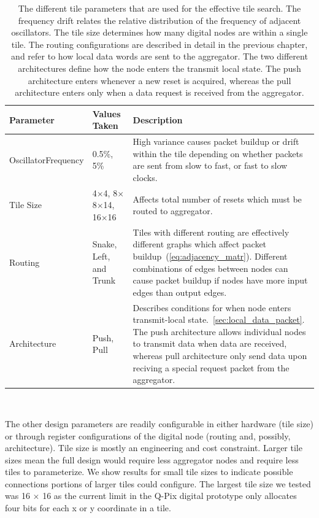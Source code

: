 \begin{table}
\begin{center}
\begin{tabular}{|| p{30mm} | p{30mm} | p{90mm} ||}
 \hline
 Parameter & Values Taken & Description \\ [0.5ex]
 \hline\hline
  Oscillator\newline Frequency & 0.5\%, 5\% & High variance causes packet buildup or drift within the tile depending on whether packets are sent from slow to fast, or fast to slow clocks. \\
 \hline
  Tile Size & 4$\times$4, 8$\times$8\newline 10$\times$14, 16$\times$16 & Affects total number of resets which must be routed to aggregator.\\
 \hline
  Routing & Snake, Left, and Trunk & Tiles with different routing are effectively different graphs which affect packet buildup~(\ref{eq:adjacency_matr}). Different combinations of edges between nodes can cause packet buildup if nodes have more input edges than output edges.  \\
 \hline
  Architecture & Push, Pull & Describes conditions for when node enters transmit-local state.~\ref{sec:local_data_packet}. The push architecture allows individual nodes to transmit data when data are received, whereas pull architecture only send data upon reciving a special request packet from the aggregator.  \\
 \hline
\end{tabular}
\caption{The different tile parameters that are used for the effective tile search.
  The frequency drift relates the relative distribution of the frequency of adjacent oscillators.
  The tile size determines how many digital nodes are within a single tile.
  The routing configurations are described in detail in the previous chapter, and refer to how local data words are sent to the aggregator.
  The two different architectures define how the node enters the transmit local state.
  The push architecture enters whenever a new reset is acquired, whereas the pull architecture enters only when a data request is received from the aggregator.}
\end{center}
\end{table}
~\label{table:tile_params}

The other design parameters are readily configurable in either hardware (tile size) or through register configurations of the digital node (routing and, possibly, architecture).
Tile size is mostly an engineering and cost constraint.
Larger tile sizes mean the full design would require less aggregator nodes and require less tiles to parameterize.
We show results for small tile sizes to indicate possible connections portions of larger tiles could configure.
The largest tile size we tested was 16 $\times$ 16 as the current limit in the Q-Pix digital prototype only allocates four bits for each x or y coordinate in a tile.

